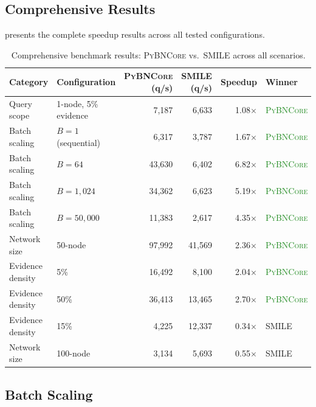 \documentclass[11pt, letterpaper]{article}
\newcommand{\bncore}{\textsc{PyBNCore}}
\newcommand{\smiletool}{\textsc{SMILE}}
\theoremstyle{definitionstyle}
\begin{document}
\subsection{Comprehensive Results}

 presents the complete speedup results across all
tested configurations.

\begin{table}[ht]
\centering
\caption{Comprehensive benchmark results: \bncore{} vs.\ \smiletool{}
across all scenarios.}
\label{tab:speedup}
\begin{tabular}{@{}llrrrl@{}}
\toprule
\textbf{Category} & \textbf{Configuration} & \textbf{\bncore{} (q/s)} & \textbf{\smiletool{} (q/s)} & \textbf{Speedup} & \textbf{Winner} \\
\midrule
Query scope      & 1-node, 5\% evidence   & 7,187    & 6,633    & 1.08$\times$ & \textcolor{ForestGreen}{\bncore{}} \\
Batch scaling    & $B=1$ (sequential)     & 6,317    & 3,787    & 1.67$\times$ & \textcolor{ForestGreen}{\bncore{}} \\
Batch scaling    & $B=64$                 & 43,630   & 6,402    & 6.82$\times$ & \textcolor{ForestGreen}{\bncore{}} \\
Batch scaling    & $B=1{,}024$            & 34,362   & 6,623    & 5.19$\times$ & \textcolor{ForestGreen}{\bncore{}} \\
Batch scaling    & $B=50{,}000$           & 11,383   & 2,617    & 4.35$\times$ & \textcolor{ForestGreen}{\bncore{}} \\
Network size     & 50-node                & 97,992   & 41,569   & 2.36$\times$ & \textcolor{ForestGreen}{\bncore{}} \\
Evidence density & 5\%                    & 16,492   & 8,100    & 2.04$\times$ & \textcolor{ForestGreen}{\bncore{}} \\
Evidence density & 50\%                   & 36,413   & 13,465   & 2.70$\times$ & \textcolor{ForestGreen}{\bncore{}} \\
\midrule
Evidence density & 15\%                   & 4,225    & 12,337   & 0.34$\times$ & \textcolor{BrickRed}{\smiletool{}} \\
Network size     & 100-node               & 3,134    & 5,693    & 0.55$\times$ & \textcolor{BrickRed}{\smiletool{}} \\
\bottomrule
\end{tabular}
\end{table}

\subsection{Batch Scaling}
\end{document}
